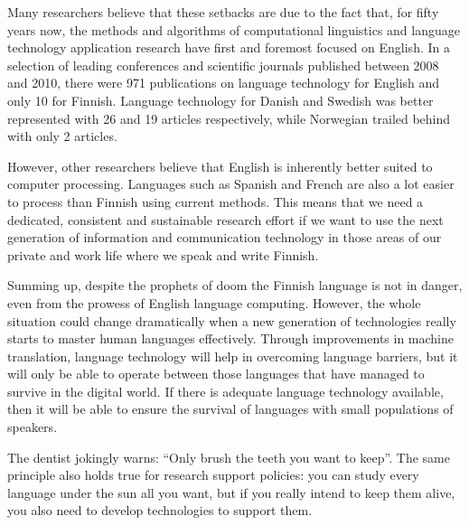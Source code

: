 \begin{multicols}{2}
Many researchers believe that these setbacks are due to the fact that, for fifty years now, the methods and algorithms of computational linguistics and language technology application research have first and foremost focused on English. In a selection of leading conferences and scientific journals published between 2008 and 2010, there were 971 publications on language technology for English and only 10 for Finnish. Language technology for Danish and Swedish was better represented with 26 and 19 articles respectively, while Norwegian trailed behind with only 2 articles.
 
However, other researchers believe that English is inherently better suited to computer processing. Languages such as Spanish and French are also a lot easier to process than Finnish using current methods. This means that we need a dedicated, consistent and sustainable research effort if we want to use the next generation of information and communication technology in those areas of our private and work life where we speak and write Finnish.

Summing up, despite the prophets of doom the Finnish language is not in danger, even from the prowess of English language computing. However, the whole situation could change dramatically when a new generation of technologies really starts to master human languages effectively. Through improvements in machine translation, language technology will help in overcoming language barriers, but it will only be able to operate between those languages that have managed to survive in the digital world. If there is adequate language technology available, then it will be able to ensure the survival of languages with small populations of speakers.

The dentist jokingly warns: ``Only brush the teeth you want to keep''.
The same principle also holds true for research support policies: you can study every language under the sun all you want, but if you really
intend to keep them alive, you also need to develop technologies to support them.


\end{multicols}
